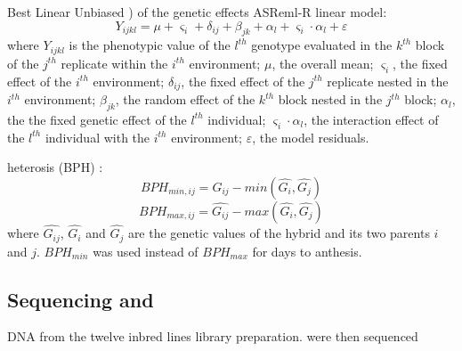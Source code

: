 \documentclass[9pt,twocolumn,twoside]{gsajnl}
\begin{document}
\DIFaddbegin {}\DIFaddend Best Linear Unbiased \DIFdelbegin {}\DIFdelend \DIFaddbegin {}\DIFaddend ) of the genetic effects \DIFdelbegin {}\DIFdelend \DIFaddbegin {}\DIFaddend ASReml-R \citep{gilmour2009asreml} \DIFdelbegin {}\DIFdelend \DIFaddbegin {}\DIFaddend linear model: 
\[Y_{ijkl} = \mu + \varsigma_{i} + \delta_{ij} + \beta_{jk} + \alpha_{l} +  \varsigma_{i} \cdot \alpha_{l} + \varepsilon\]
where 
$Y_{ijkl}$ is the phenotypic value of the $l^{th}$ genotype evaluated in the $k^{th}$ block of the $j^{th}$ replicate within the $i^{th}$ environment; 
$\mu$, the overall mean; 
$\varsigma_{i}$, the fixed effect of the $i^{th}$ environment;
$\delta_{ij}$, the fixed effect of the $j^{th}$ replicate nested in the $i^{th}$ environment; 
$\beta_{jk}$, the random effect of the $k^{th}$ block nested in the $j^{th}$ block; 
$\alpha_{l}$, the the fixed genetic effect  of the $l^{th}$ individual; 
$\varsigma_{i} \cdot \alpha_{l}$, the interaction effect of the $l^{th}$ individual with the $i^{th}$ environment; 
$\varepsilon$, the model residuals. \DIFaddbegin {}
\DIFaddend 

\DIFdelbegin {}\DIFdelend \DIFaddbegin {}\DIFaddend heterosis (BPH) \DIFaddbegin {}\DIFaddend :
\[ BPH_{min,ij}=\hat{G_{ij}}-min(\hat{G_{i}} ,\hat{G_{j}}) \] 
\[ BPH_{max,ij}=\hat{G_{ij}}-max(\hat{G_{i}} ,\hat{G_{j}}) \]
where $\hat{G_{ij}}$, $\hat{G_{i}}$ and $\hat{G_{j}}$ are the genetic values of the hybrid and its two parents $i$ and $j$. $BPH_{min}$ was used instead of $BPH_{max}$ for days to anthesis. \DIFaddbegin {}
\DIFaddend 

\subsection*{Sequencing and \DIFdelbegin {}\DIFdelend \DIFaddbegin {}\DIFaddend }

\DIFaddbegin {}\DIFaddend DNA from the twelve inbred lines \DIFdelbegin {}\DIFdelend \DIFaddbegin {} \DIFaddend library preparation. \DIFdelbegin {}\DIFdelend \DIFaddbegin {}\DIFaddend were then sequenced \DIFdelbegin {}\DIFdelend \DIFaddbegin {}\DIFaddend 
\end{document}
